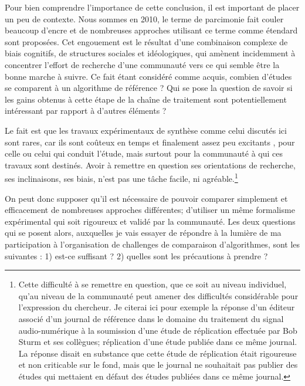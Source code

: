 
Pour bien comprendre l'importance de cette conclusion, il est important de placer un peu de contexte. Nous sommes en 2010, le terme de parcimonie fait couler beaucoup d'encre et de nombreuses approches utilisant ce terme comme étendard sont proposées. Cet engouement est le résultat d'une combinaison complexe de biais cognitifs, de structures sociales et idéologiques, qui amènent incidemment à concentrer l'effort de recherche d'une communauté vers ce qui semble être la bonne marche à suivre. Ce fait étant considéré comme acquis, combien d'études se comparent à un algorithme de référence ? Qui se pose la question de savoir si les gains obtenus à cette étape de la chaîne de traitement sont potentiellement intéressant par rapport à d'autres éléments ?

Le fait est que les travaux expérimentaux de synthèse comme celui discutés ici sont rares, car ils sont coûteux en temps et finalement assez peu \og excitants \fg, pour celle ou celui qui conduit l'étude, mais surtout pour la communauté à qui ces travaux sont destinés. Avoir à remettre en question ses orientations de recherche, ses inclinaisons, ses biais, n'est pas une tâche facile, ni agréable.\footnote{Cette difficulté à se remettre en question, que ce soit au niveau individuel, qu'au niveau de la communauté peut amener des difficultés considérable pour l'expression du chercheur. Je citerai ici pour exemple la réponse d'un éditeur associé d'un journal de référence dans le domaine du traitement du signal audio-numérique à la soumission d'une étude de réplication effectuée par Bob Sturm et ses collègues; réplication d'une étude publiée dans ce même journal. La réponse disait en substance que cette étude de réplication était rigoureuse et non criticable sur le fond, mais que le journal ne souhaitait pas publier des études qui mettaient en défaut des études publiées dans ce même journal.}

On peut donc supposer qu'il est nécessaire de pouvoir comparer simplement et efficacement de nombreuses approches différentes; d'utiliser un même formalisme expérimental qui soit rigoureux et validé par la communauté. Les deux questions qui se posent alors, auxquelles je vais essayer de répondre à la lumière de ma participation à l'organisation de challenges de comparaison d'algorithmes, sont les suivantes : 1) est-ce suffisant ? 2) quelles sont les précautions à prendre ?

